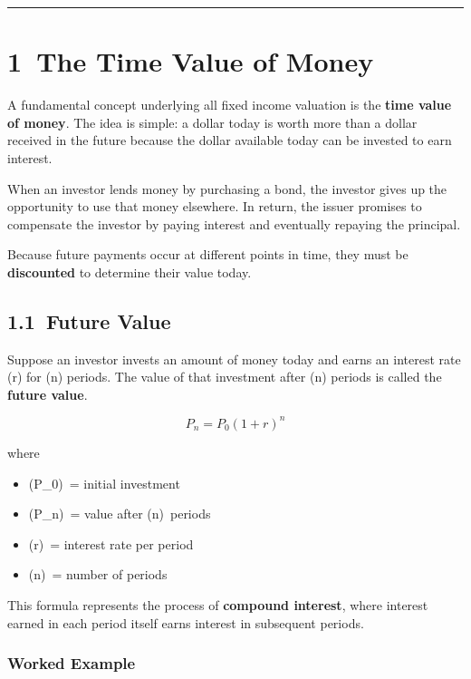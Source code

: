 \documentclass[
  letterpaper,
  DIV=11,
  numbers=noendperiod]{scrartcl}
\providecommand{\tightlist}{%
  \setlength{\itemsep}{0pt}\setlength{\parskip}{0pt}}
\begin{document}
\begin{center}\rule{0.5\linewidth}{0.5pt}\end{center}

\section{1~The Time Value of Money}\label{the-time-value-of-money}

A fundamental concept underlying all fixed income valuation is the
\textbf{time value of money}. The idea is simple: a dollar today is
worth more than a dollar received in the future because the dollar
available today can be invested to earn interest.

When an investor lends money by purchasing a bond, the investor gives up
the opportunity to use that money elsewhere. In return, the issuer
promises to compensate the investor by paying interest and eventually
repaying the principal.

Because future payments occur at different points in time, they must be
\textbf{discounted} to determine their value today.

\subsection{1.1~Future Value}\label{future-value}

Suppose an investor invests an amount of money today and earns an
interest rate (r) for (n) periods. The value of that investment after
(n) periods is called the \textbf{future value}.

\[
P_n = P_0 (1+r)^n
\]

where

\begin{itemize}
\tightlist
\item
  (P\_0)~= initial investment\\
\item
  (P\_n)~= value after (n)~periods\\
\item
  (r)~= interest rate per period\\
\item
  (n)~= number of periods
\end{itemize}

This formula represents the process of \textbf{compound interest}, where
interest earned in each period itself earns interest in subsequent
periods.

\subsubsection{Worked Example}\label{worked-example}
\end{document}
